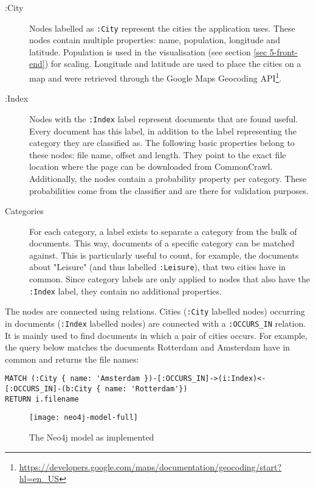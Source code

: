 \begin{description}
\item[:City] Nodes labelled as \texttt{:City} represent the cities the application uses. These nodes contain multiple properties: name, population, longitude and latitude. Population is used in the visualisation (see section \ref{sec 5-front-end}) for scaling. Longitude and latitude are used to place the cities on a map and were retrieved through the Google Maps Geocoding API\footnote{\url{https://developers.google.com/maps/documentation/geocoding/start?hl=en_US}}.
\item[:Index] Nodes with the \texttt{:Index} label represent documents that are found useful. Every document has this label, in addition to the label representing the category they are classified as. The following basic properties belong to these nodes: file name, offset and length. They point to the exact file location where the page can be downloaded from CommonCrawl. Additionally, the nodes contain a probability property per category. These probabilities come from the classifier and are there for validation purposes.
\item[Categories] For each category, a label exists to separate a category from the bulk of documents. This way, documents of a specific category can be matched against. This is particularly useful to count, for example, the documents about "Leisure" (and thus labelled \texttt{:Leisure}), that two cities have in common. Since category labels are only applied to nodes that also have the \texttt{:Index} label, they contain no additional properties.
\end{description}

The nodes are connected using relations. Cities (\texttt{:City} labelled nodes) occurring in documents (\texttt{:Index} labelled nodes) are connected with a \texttt{:OCCURS_IN} relation. It is mainly used to find documents in which a pair of cities occurs. For example, the query below matches the documents Rotterdam and Amsterdam have in common and returns the file names:

\begin{lstlisting}[language=cypher, caption=Querying documents containing two cities, label={lst:query-occ}]
MATCH (:City { name: 'Amsterdam })-[:OCCURS_IN]->(i:Index)<-[:OCCURS_IN]-(b:City { name: 'Rotterdam'})
RETURN i.filename
\end{lstlisting}

\begin{figure}
    \centering
    \texttt{[image: neo4j-model-full]}
    \caption{The Neo4j model as implemented}
    \label{fig:my_label}
\end{figure}

